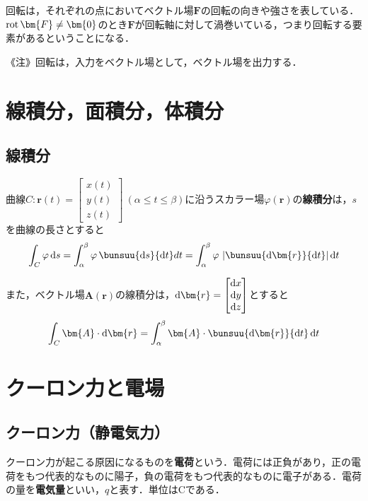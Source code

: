 回転は，それぞれの点においてベクトル場$\bm{F}$の回転の向きや強さを表している．$\rot \bm{F} \ne \bm{0}$のとき$\bm{F}$が回転軸に対して渦巻いている，つまり回転する要素があるということになる．

《注》回転は，入力をベクトル場として，ベクトル場を出力する．



\section{線積分，面積分，体積分}
\subsection{線積分}

曲線$C: \bm{r}(t) =
\begin{bmatrix}
	x(t)\\ y(t)\\ z(t)
\end{bmatrix}\ (\alpha \le t \le \beta)$に沿うスカラー場$\varphi(\bm{r})$の\textbf{線積分}は，$s$を曲線の長さとすると
\begin{equation}
	\int_{C} \varphi\,\md s = \int_{\alpha}^{\beta} \varphi\,\bunsuu{\md s}{\md t}dt = \int_{\alpha}^{\beta} \varphi\,\left|\bunsuu{\md\bm{r}}{\md t}\right|\md t
\end{equation}

また，ベクトル場$\bm{A}(\bm{r})$の線積分は，$\md\bm{r} =
\begin{bmatrix}
	\md x\\ \md y\\ \md z
\end{bmatrix}
$とすると
\begin{equation}
	\int_{C} \bm{A} \cdot \md\bm{r} = \int_{\alpha}^{\beta} \bm{A} \cdot \bunsuu{\md\bm{r}}{\md t}\,\md t
\end{equation}



\section{クーロン力と電場}
\subsection{クーロン力（静電気力）}

クーロン力が起こる原因になるものを\textbf{電荷}という．電荷には正負があり，正の電荷をもつ代表的なものに陽子，負の電荷をもつ代表的なものに電子がある．電荷の量を\textbf{電気量}といい，$q$と表す．単位は$\mathrm{C}$である．

